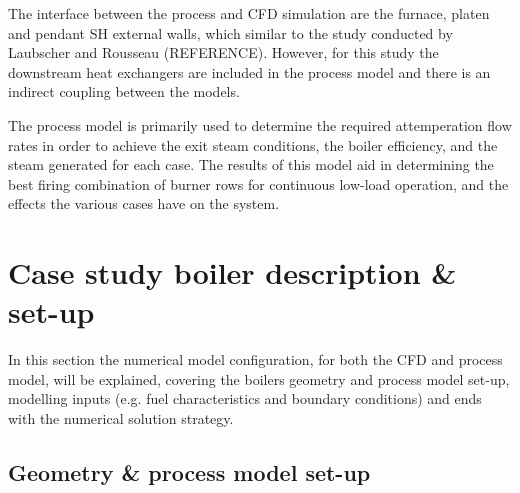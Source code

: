 \documentclass[review]{elsarticle}
\begin{document}
The interface between the process and CFD simulation are the furnace, platen and pendant SH external walls, which similar to the study conducted by Laubscher and Rousseau (REFERENCE). However, for this study the downstream heat exchangers are included in the process model and there is an indirect coupling between the models.

The process model is primarily used to determine the required attemperation flow rates in order to achieve the exit steam conditions, the boiler efficiency, and the steam generated for each case. The results of this model aid in determining the best firing combination of burner rows for continuous low-load operation, and the effects the various cases have on the system.

\section{Case study boiler description \& set-up}
In this section the numerical model configuration, for both the CFD and process model, will be explained, covering the boilers geometry and process model set-up,  modelling inputs (e.g. fuel characteristics and boundary conditions) and ends with the numerical solution strategy.
\newpage
\subsection{Geometry \& process model set-up}
 
\end{document}
